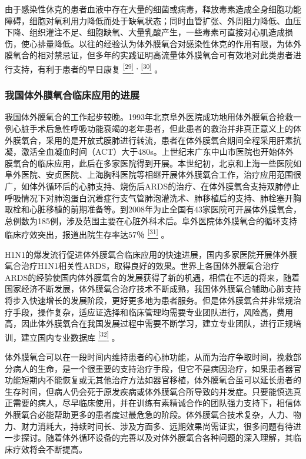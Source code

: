 由于感染性休克的患者血液中存在大量的细菌或病毒，释放毒素造成全身细胞功能障碍，细胞对氧利用力降低而处于缺氧状态；同时血管扩张、外周阻力降低、血压下降、组织灌注不足、细胞缺氧、大量乳酸产生，一些毒素可直接对心肌造成损伤，使心排量降低。以往的经验认为体外膜氧合对感染性休克的作用有限，为体外膜氧合的相对禁忌证，但多年的实践证明高流量体外膜氧合可有效地对此类患者进行支持，有利于患者的早日康复
\protect\hyperlink{text00030.htmlux5cux23ch29-29}{\textsuperscript{{[}29{]}}}
\textsuperscript{,}
\protect\hyperlink{text00030.htmlux5cux23ch30-29}{\textsuperscript{{[}30{]}}}
。

\subsubsection{我国体外膜氧合临床应用的进展}

我国体外膜氧合的工作起步较晚。1993年北京阜外医院成功地用体外膜氧合抢救一例心脏手术后急性呼吸功能衰竭的老年患者，但此患者的救治并非真正意义上的体外膜氧合，采用的是开放式膜肺进行转流，患者在体外膜氧合期间全程采用肝素抗凝，激活全血凝血时间（ACT）大于480s。上世纪末广东中山市医院也开始体外膜氧合的临床应用，此后在多家医院得到开展。本世纪初，北京和上海一些医院如阜外医院、安贞医院、上海胸科医院等相继开展体外膜氧合工作，治疗应用范围很广，如体外循环后的心肺支持、烧伤后ARDS的治疗、在体外膜氧合支持双肺停止呼吸情况下对肺泡蛋白沉着症行支气管肺泡灌洗术、肺移植后的支持、肺栓塞开胸取栓和心脏移植的前期准备等。到2008年为止全国有43家医院可开展体外膜氧合，总例数为185例，涉及范围主要在心脏外科术后。阜外医院体外膜氧合的循环支持临床疗效突出，报道出院生存率达57％
\protect\hyperlink{text00030.htmlux5cux23ch31-29}{\textsuperscript{{[}31{]}}}
。

H1N1的爆发流行促进体外膜氧合临床应用的快速进展，国内多家医院开展体外膜氧合治疗H1N1相关性ARDS，取得良好的效果。世界上各国体外膜氧合治疗ARDS的经验使国内体外膜氧合的发展获得了新的机遇，相信在不远的将来，随着国家经济不断发展，体外膜氧合治疗技术不断成熟，我国体外膜氧合辅助心肺支持将步入快速增长的发展阶段，更好更多地为患者服务。但是体外膜氧合并非常规治疗手段，操作复杂，适应证选择和临床管理均需要专业团队进行，风险高，费用高，因此体外膜氧合在我国发展过程中需要不断学习，建立专业团队，进行正规培训，建立国内专业数据库
\protect\hyperlink{text00030.htmlux5cux23ch32-29}{\textsuperscript{{[}32{]}}}
。

体外膜氧合可以在一段时间内维持患者的心肺功能，从而为治疗争取时间，挽救部分病人的生命，是一个很重要的支持治疗手段，但它不是病因治疗，如果患者器官功能短期内不能恢复或无其他治疗方法如器官移植，体外膜氧合虽可以延长患者的生存时间，但病人仍会死于原发疾病或体外膜氧合所导致的并发症。只要能慎选真正需要的病人，尽早临床使用，并在训练有素精诚合作的团队强力支持下，相信体外膜氧合必能帮助更多的患者度过最危急的阶段。体外膜氧合技术复杂，人力、物力、财力消耗大，持续时间长、涉及方面多、远期效果尚需证实，很多问题有待进一步探讨。随着体外循环设备的完善以及对体外膜氧合各种问题的深入理解，其临床疗效将会不断提高。

